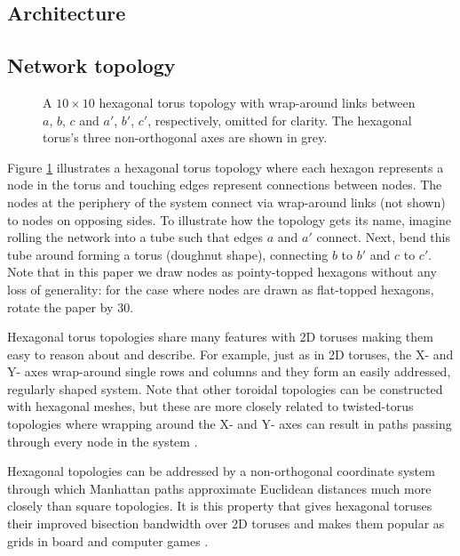 		\subsection{Architecture}
		\subsection{Network topology}
		
			
			
			\begin{figure}
				\center
				
				\caption{A $10 \times 10$ hexagonal torus topology with wrap-around
				links between $a$, $b$, $c$ and $a'$, $b'$, $c'$, respectively, omitted
				for clarity. The hexagonal torus's three non-orthogonal axes are shown
				in grey.}
				\label{fig:hexagonalTorusTopology}
			\end{figure}
			
			Figure \ref{fig:hexagonalTorusTopology} illustrates a hexagonal torus
			topology where each hexagon represents a node in the torus and touching
			edges represent connections between nodes. The nodes at the periphery of
			the system connect via wrap-around links (not shown) to nodes on opposing
			sides. To illustrate how the topology gets its name, imagine rolling the
			network into a tube such that edges $a$ and $a'$ connect. Next, bend this
			tube around forming a torus (doughnut shape), connecting $b$ to $b'$ and
			$c$ to $c'$. Note that in this paper we draw nodes as pointy-topped
			hexagons without any loss of generality: for the case where nodes are
			drawn as flat-topped hexagons, rotate the paper by 30\degree{}.
			
			Hexagonal torus topologies share many features with 2D toruses making them
			easy to reason about and describe. For example, just as in 2D toruses, the
			X- and Y- axes wrap-around single rows and columns and they form an easily
			addressed, regularly shaped system. Note that other toroidal topologies
			can be constructed with hexagonal meshes, but these are more closely
			related to twisted-torus topologies where wrapping around the X- and Y-
			axes can result in paths passing through every node in the system
			\cite{camara10}.
			
			Hexagonal topologies can be addressed by a non-orthogonal coordinate
			system through which Manhattan paths approximate Euclidean distances much
			more closely than square topologies. It is this property that gives
			hexagonal toruses their improved bisection bandwidth over 2D toruses and
			makes them popular as grids in board and computer games \cite{patel15}.
		
